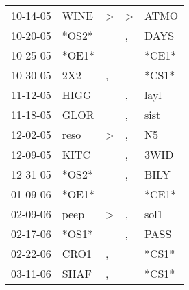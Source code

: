 \begin{supertabular}{p{0.07\textwidth}p{0.06\textwidth}p{0.02\textwidth}p{0.02\textwidth}p{0.06\textwidth}}
          10-14-05\textsuperscript{} &           WINE\textsuperscript{} &     \textgreater &     \textgreater &           ATMO\textsuperscript{} \\
          10-20-05\textsuperscript{} &                            *OS2* &                  &                , &           DAYS\textsuperscript{} \\
          10-25-05\textsuperscript{} &                            *OE1* &                  &                  &                            *CE1* \\
          10-30-05\textsuperscript{} &            2X2\textsuperscript{} &                , &                  &                            *CS1* \\
          11-12-05\textsuperscript{} &           HIGG\textsuperscript{} &                  &                , &           layl\textsuperscript{} \\
          11-18-05\textsuperscript{} &           GLOR\textsuperscript{} &                  &                , &           sist\textsuperscript{} \\
          12-02-05\textsuperscript{} &           reso\textsuperscript{} &     \textgreater &                , &             N5\textsuperscript{} \\
          12-09-05\textsuperscript{} &           KITC\textsuperscript{} &                  &                , &           3WID\textsuperscript{} \\
          12-31-05\textsuperscript{} &                            *OS2* &                  &                , &           BILY\textsuperscript{} \\
          01-09-06\textsuperscript{} &                            *OE1* &                  &                  &                            *CE1* \\
          02-09-06\textsuperscript{} &           peep\textsuperscript{} &     \textgreater &                , &           sol1\textsuperscript{} \\
          02-17-06\textsuperscript{} &                            *OS1* &                  &                , &           PASS\textsuperscript{} \\
          02-22-06\textsuperscript{} &           CRO1\textsuperscript{} &                , &                  &                            *CS1* \\
          03-11-06\textsuperscript{} &           SHAF\textsuperscript{} &                , &                  &                            *CS1* \\

\end{supertabular}
